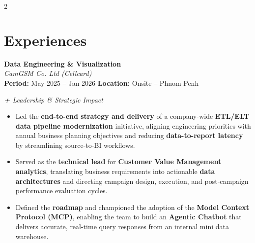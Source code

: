 \documentclass[11pt,a4paper]{article}
\newcommand{\jobentry}[4]{%
  {\textbf{#1}}\\
  {\itshape #2}\\[2pt]
  {\small \textbf{Period:} #3 \hfill \textbf{Location:} #4}
}
\begin{document}
\begin{paracol}{2}

  \section{Experiences}

  \jobentry{Data Engineering \& Visualization}{CamGSM Co. Ltd (Cellcard)}{May 2025 -- Jan 2026}{Onsite -- Phnom Penh}

  \vspace{5pt}
  {\small\textit{\textcolor{accentblue}{\textbf{+} Leadership \& Strategic Impact}}}
  \begin{itemize}[leftmargin=1.2em, itemsep=2pt, topsep=2pt]
    \item Led the \textbf{end-to-end strategy and delivery} of a company-wide \textbf{ETL/ELT data pipeline modernization} initiative, aligning engineering priorities with annual business planning objectives and reducing \textbf{data-to-report latency} by streamlining source-to-BI workflows.
    \item Served as the \textbf{technical lead} for \textbf{Customer Value Management analytics}, translating business requirements into actionable \textbf{data architectures} and directing campaign design, execution, and post-campaign performance evaluation cycles.
    \item Defined the \textbf{roadmap} and championed the adoption of the \textbf{Model Context Protocol (MCP)}, enabling the team to build an \textbf{Agentic Chatbot} that delivers accurate, real-time query responses from an internal mini data warehouse.
  \end{itemize}



\end{paracol}
\end{document}
